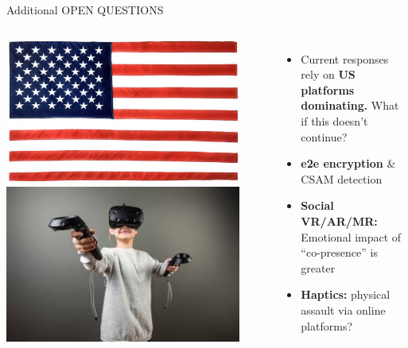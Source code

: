 \documentclass[nobackground,dvipsnames,table,aspectratio=169]{beamer}
\begin{document}
\begin{frame}{Additional OPEN QUESTIONS}
    \begin{columns}
            \includegraphics[width=0.9\textwidth]{us-flag}
            \includegraphics[width=0.9\textwidth]{vr}
            \begin{itemize}
                \item Current responses rely on \textbf{US platforms dominating.} What if this doesn’t continue?
                \item \textbf{e2e encryption} \& CSAM detection 
                \item \textbf{Social VR/AR/MR:} Emotional impact of “co-presence” is greater
                \item \textbf{Haptics:} physical assault via online platforms?
            \end{itemize}
    \end{columns}
\end{frame}
\end{document}
